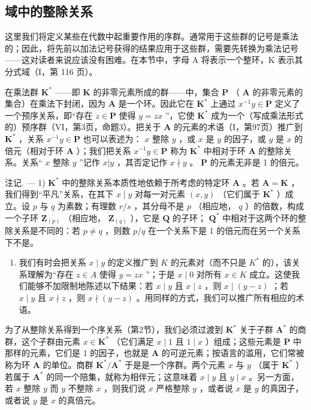 \subsection{域中的整除关系}

这里我们将定义某些在代数中起重要作用的序群。通常用于这些群的记号是乘法的；因此，将先前以加法记号获得的结果应用于这些群，需要先转换为乘法记号——这对读者来说应该没有困难。在本节中，字母 A 将表示一个整环，K 表示其分式域（I，第 116 页）。

在乘法群 \(\mathbf{K}^*\) ——即 \(\mathbf{K}\) 的非零元素所成的群——中，集合 \(\mathbf{P}\) （ \(\mathbf{A}\) 的非零元素的集合）在乘法下封闭，因为 \(\mathbf{A}\) 是一个环。因此它在 \(\mathbf{K}^*\) 上通过 \(x^{-1}y\in \mathbf{P}\) 定义了一个预序关系，即“存在 \(z\in \mathbf{P}\) 使得 \(y = zx\) ”，它使 \(\mathbf{K}^*\) 成为一个（写成乘法形式的）预序群（VI，第3页，命题3）。把关于 \(\mathbf{A}\) 的元素的术语（I，第97页）推广到 \(\mathbf{K}^*\) ，关系 \(x^{-1}y\in \mathbf{P}\) 也可以表述为： \(x\) 整除 \(y\) ，或 \(x\) 是 \(y\) 的因子，或 \(y\) 是 \(x\) 的倍元（相对于环 \(\mathbf{A}\) ）；我们把关系 \(x^{-1}y\in \mathbf{P}\) 称为 \(\mathbf{K}^*\) 中相对于环 \(\mathbf{A}\) 的整除关系。关系“ \(x\) 整除 \(y\) ”记作 \(x|y\) ，其否定记作 \(x\nmid y\) 。 \(\mathbf{P}\) 的元素无非是 1 的倍元。

注记. --- 1) \(\mathbf{K}^*\) 中的整除关系本质性地依赖于所考虑的特定环 \(\mathbf{A}\) 。若 \(\mathbf{A} = \mathbf{K}\) ，我们得到“平凡”关系，在其下 \(x \mid y\) 对每一对元素 \((x, y)\) （它们属于 \(\mathbf{K}^*\) ）成立。设 \(p\) 与 \(q\) 为素数；有理数 \(r/s\) ，其分母不是 \(p\) （相应地， \(q\) ）的倍数，构成一个子环 \(\mathbf{Z}_{(p)}\) （相应地， \(\mathbf{Z}_{(q)}\) ），它是 \(\mathbf{Q}\) 的子环； \(\mathbf{Q}^*\) 中相对于这两个环的整除关系是不同的：若 \(p \neq q\) ，则数 \(p/q\) 在一个关系下是 1 的倍元而在另一个关系下不是。

\begin{enumerate}
\def\labelenumi{\arabic{enumi})}
\setcounter{enumi}{1}
\tightlist
\item
  我们有时会把关系 \(x \mid y\) 的定义推广到 \(K\) 的元素对（而不只是 \(K^*\) 的），该关系理解为“存在 \(z \in A\) 使得 \(y = zx\) ”；于是 \(x \mid 0\) 对所有 \(x \in K\) 成立。这使我们能够不加限制地陈述以下结果：若 \(x \mid y\) 且 \(x \mid z\) ，则 \(x \mid (y - z)\) ；若 \(x \mid y\) 且 \(x \nmid z\) ，则 \(x \nmid (y - z)\) 。用同样的方式，我们可以推广所有相应的术语。
\end{enumerate}

为了从整除关系得到一个序关系（第2节），我们必须过渡到 \(\mathbf{K}^*\) 关于子群 \(\mathbf{A}^*\) 的商群，这个子群由元素 \(x \in \mathbf{K}^*\) （它们满足 \(x \mid 1\) 且 \(1 \mid x\) ）组成；这些元素是 \(\mathbf{P}\) 中那样的元素，它们是 1 的因子，也就是 \(\mathbf{A}\) 的可逆元素；按语言的滥用，它们常被称为环 \(\mathbf{A}\) 的单位。商群 \(\mathbf{K}^* / \mathbf{A}^*\) 于是是一个序群。两个元素 \(x\) 与 \(y\) （属于 \(\mathbf{K}^*\) ）若属于 \(\mathbf{A}^*\) 的同一个陪集，就称为相伴元；这意味着 \(x \mid y\) 且 \(y \mid x\) 。另一方面，若 \(x\) 整除 \(y\) 而 \(y\) 不整除 \(x\) ，则我们说 \(x\) 严格整除 \(y\) ，或者说 \(x\) 是 \(y\) 的真因子，或者说 \(y\) 是 \(x\) 的真倍元。

